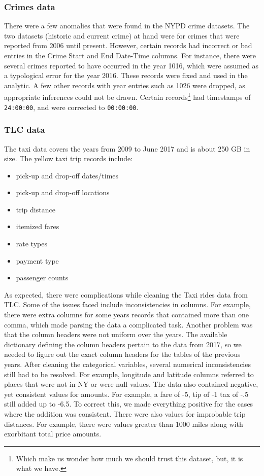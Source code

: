 \documentclass{sigkddExp}
\begin{document}
\subsubsection{Crimes data}
There were a few anomalies that were found in the NYPD crime datasets. The two datasets (historic and current crime) at hand were for crimes that were reported from 2006 until present. However, certain records had incorrect or bad entries in the Crime Start and End Date-Time columns. For instance, there were several crimes reported to have occurred in the year 1016, which were assumed as a typological error for the year 2016. These records were fixed and used in the analytic. A few other records with year entries such as 1026 were dropped, as appropriate inferences could not be drawn. Certain records\footnote{Which make us wonder how much we should trust this dataset, but, it is what we have.} had timestamps of \texttt{24:00:00}, and were corrected to \texttt{00:00:00}.

\subsubsection{TLC data}

The taxi data covers the years from 2009 to June 2017 and is about 250 GB in size. The yellow taxi trip records include:

\begin{itemize}
\item pick-up and drop-off dates/times 
\item pick-up and drop-off locations 
\item trip distance
\item itemized fares 
\item rate types 
\item payment type 
\item passenger counts 
\end{itemize}

As expected, there were complications while cleaning the Taxi rides data from TLC. Some of the issues faced include inconsistencies in columns. For example, there were extra columns for some years records that contained more than one comma, which made parsing the data a complicated task. 
Another problem was that the column headers were not uniform over the years. The available dictionary defining the column headers pertain to the data from 2017, so we needed to figure out the exact column headers for the tables of the previous years.
After cleaning the categorical variables, several numerical inconsistencies still had to be resolved. For example, longitude and latitude columns referred to places that were not in NY or were null values. The data also contained negative, yet consistent values for amounts. For example, a fare of -5, tip of -1 tax of -.5 still added up to -6.5. To correct this, we made everything positive for the cases where the addition was consistent. There were also values for improbable trip distances. For example, there were values greater than 1000 miles along with exorbitant total price amounts.
\end{document}
